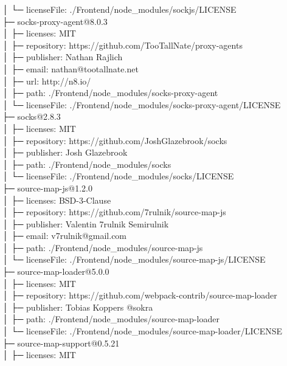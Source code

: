 \documentclass[
    paper=a4,
    twoside=false,
    parskip=half,
    listof=entryprefix,
    listof=totoc,
    index=totoc,
    bibliography=totoc,
    headsepline,
]{scrbook}
\begin{document}
    │  └─ licenseFile: ./Frontend/node\_modules/sockjs/LICENSE\\
    ├─ socks-proxy-agent@8.0.3\\
    │  ├─ licenses: MIT\\
    │  ├─ repository: https://github.com/TooTallNate/proxy-agents\\
    │  ├─ publisher: Nathan Rajlich\\
    │  ├─ email: nathan@tootallnate.net\\
    │  ├─ url: http://n8.io/\\
    │  ├─ path: ./Frontend/node\_modules/socks-proxy-agent\\
    │  └─ licenseFile: ./Frontend/node\_modules/socks-proxy-agent/LICENSE\\
    ├─ socks@2.8.3\\
    │  ├─ licenses: MIT\\
    │  ├─ repository: https://github.com/JoshGlazebrook/socks\\
    │  ├─ publisher: Josh Glazebrook\\
    │  ├─ path: ./Frontend/node\_modules/socks\\
    │  └─ licenseFile: ./Frontend/node\_modules/socks/LICENSE\\
    ├─ source-map-js@1.2.0\\
    │  ├─ licenses: BSD-3-Clause\\
    │  ├─ repository: https://github.com/7rulnik/source-map-js\\
    │  ├─ publisher: Valentin 7rulnik Semirulnik\\
    │  ├─ email: v7rulnik@gmail.com\\
    │  ├─ path: ./Frontend/node\_modules/source-map-js\\
    │  └─ licenseFile: ./Frontend/node\_modules/source-map-js/LICENSE\\
    ├─ source-map-loader@5.0.0\\
    │  ├─ licenses: MIT\\
    │  ├─ repository: https://github.com/webpack-contrib/source-map-loader\\
    │  ├─ publisher: Tobias Koppers @sokra\\
    │  ├─ path: ./Frontend/node\_modules/source-map-loader\\
    │  └─ licenseFile: ./Frontend/node\_modules/source-map-loader/LICENSE\\
    ├─ source-map-support@0.5.21\\
    │  ├─ licenses: MIT\\
\end{document}
